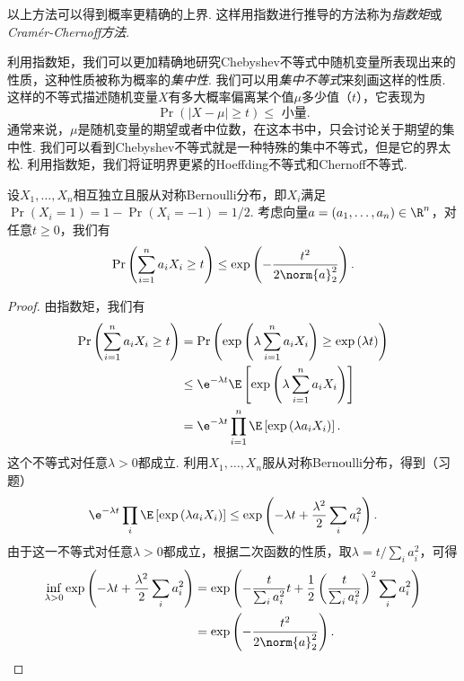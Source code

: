 以上方法可以得到概率更精确的上界. 这样用指数进行推导的方法称为\emph{指数矩}或\emph{Cramér-Chernoff方法}. 

利用指数矩，我们可以更加精确地研究Chebyshev不等式中随机变量所表现出来的性质，这种性质被称为概率的\emph{集中性}. 我们可以用\emph{集中不等式}来刻画这样的性质. 这样的不等式描述随机变量$X$有多大概率偏离某个值$\mu$多少值（$t$），它表现为
\[
\Pr(| X - \mu| \geq t) \leq \text{ 小量}.
\]
通常来说，$\mu$是随机变量的期望或者中位数，在这本书中，只会讨论关于期望的集中性. 我们可以看到Chebyshev不等式就是一种特殊的集中不等式，但是它的界太松. 利用指数矩，我们将证明界更紧的Hoeffding不等式和Chernoff不等式. 

\begin{theorem}\label{thm:hoeffding-inequality}
    设$X_1, \dots, X_n$相互独立且服从对称Bernoulli分布，即$X_i$满足$\Pr(X_i=1)=1-\Pr(X_i=-1)=1/2$. 考虑向量$a = (a_1, \dots, a_n) \in \R^n$，对任意$t\geq0$，我们有
    \[
        \Pr\left(\sum_{i=1}^n a_i X_i \geq t\right)\leq \exp \left( - \frac{t^2}{2\norm{a}^2_2}\right).
    \]
\end{theorem}
\begin{proof}
由指数矩，我们有
\[
\begin{aligned}
    \Pr\left(\sum_{i=1}^n a_i X_i \geq t\right) &= \Pr\left(\exp\left(\lambda \sum_{i=1}^n a_i X_i\right) \geq \exp\left(\lambda t\right)\right) \\
    &\leq \e^{-\lambda t} \E \left[\exp\left(\lambda \sum_{i=1}^n a_i X_i\right)\right]\\
    &=  \e^{-\lambda t}\prod_{i=1}^n \E\left[\exp\left(\lambda a_i X_i\right)\right].
\end{aligned}
\]
这个不等式对任意$\lambda > 0$都成立. 
利用$X_1, \dots, X_n$服从对称Bernoulli分布，得到（习题）
\begin{equation}
\e^{-\lambda t}\prod_{i} \E\left[\exp\left(\lambda a_i X_i\right)\right]\leq\exp \left(-\lambda t + \frac{\lambda^2}{2} \sum_{i} a_i^2\right).\label{eq:exponential-moment}
\end{equation}
由于这一不等式对任意$\lambda > 0$都成立，根据二次函数的性质，取$\lambda = t / \sum_i a_i^2$，可得
\[
\begin{aligned}
    \inf_{\lambda>0}\exp \left(-\lambda t + \frac{\lambda^2}{2} \sum_{i} a_i^2\right) &=\exp\left( -\frac{t}{\sum_i a_i^2} t + \frac12 \left(\frac{t}{\sum_i a_i^2}\right)^2 \sum_{i} a_i^2\right) \\
    &= \exp \left( - \frac{t^2}{2\norm{a}_2^2}\right).
\end{aligned}
\]
\end{proof}

